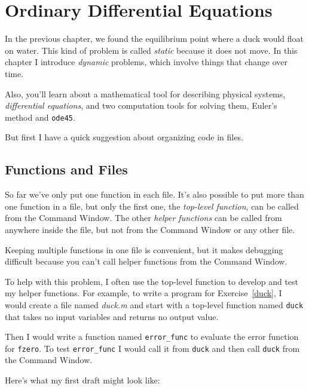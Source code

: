 \chapter{Ordinary Differential Equations}

In the previous chapter, we found the equilibrium point where a duck would float on water.  This kind of problem is called {\em static} because it does not move.  In this chapter I introduce {\em dynamic} problems, which involve things that change over time.
 
Also, you'll learn about a mathematical tool for describing physical systems, {\em differential equations}, and two computation tools for solving them, Euler's method and {\tt ode45}.

But first I have a quick suggestion about organizing code in files.

\section{Functions and Files}
\label{funfiles}

So far we've only put one function in each file.  It's also possible
to put more than one function in a file, but only the first one, the
{\em top-level function}, can be called from the Command
Window. 
The other {\em helper functions} can be called from anywhere inside the file, 
but not from the Command Window or any other file.


Keeping multiple functions in one file is convenient, but it makes debugging
difficult because you can't call helper functions from the Command
Window.

To help with this problem, I often use the top-level function
to develop and test my helper functions.  For example, to write
a program for Exercise~\ref{duck}, I would create a file named
{\em duck.m} and start with a top-level function named {\tt duck}
that takes no input variables and returns no output value.

Then I would write a function named \verb"error_func" to
evaluate the error function for {\tt fzero}.  To test
\verb"error_func" I would call it from {\tt duck} and then
call {\tt duck} from the Command Window.


Here's what my first draft might look like:

